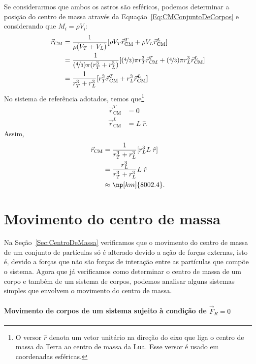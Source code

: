 Se considerarmos que ambos os astros são esféricos, podemos determinar a posição do centro de massa através da Equação~\ref{Eq:CMConjuntoDeCorpos} e considerando que $M_i = \rho V_i$:
 \begin{align}
    \vec{r}_{\rm{CM}} &= \frac{1}{\rho(V_T + V_L)} [\rho V_T \vec{r}_{\text{CM}}^T + \rho V_L \vec{r}_{\text{CM}}^L] \\
    &= \frac{1}{(\nicefrac{4}{3}) \pi(r_T^3 + r_L^3)}[(\nicefrac{4}{3})\pi r_T^3 \vec{r}_{\text{CM}}^T + (\nicefrac{4}{3})\pi r_L^3 \vec{r}_{\text{CM}}^L] \\
    &= \frac{1}{r_T^3 + r_L^3} [r_T^3 \vec{r}_{\text{CM}}^T + r_L^3 \vec{r}_{\text{CM}}^L] 
\end{align}
%
No sistema de referência adotados, temos que\footnote{O versor $\hat{r}$ denota um vetor unitário na direção do eixo que liga o centro de massa da Terra ao centro de massa da Lua. Esse versor é usado em coordenadas esféricas.}
\begin{align}
    \vec{r}_{\text{CM}}^T &= 0 \\
    \vec{r}_{\text{CM}}^L &= L \; \hat{r}.
\end{align}
%
Assim,
 \begin{align}
    \vec{r}_{\rm{CM}} &= \frac{1}{r_T^3 + r_L^3} [r_L^3 L \; \hat{r}] \\
    &=\frac{r_L^3}{r_T^3 + r_L^3} L \; \hat{r} \\
    &\approx \np[km]{8002.4}.
\end{align}

\section{Movimento do centro de massa}

Na Seção~\ref{Sec:CentroDeMassa} verificamos que o movimento do centro de massa de um conjunto de partículas só é alterado devido a ação de forças externas, isto é, devido a forças que não são forças de interação entre as partículas que compõe o sistema. Agora que já verificamos como determinar o centro de massa de um corpo e também de um sistema de corpos, podemos analisar alguns sistemas simples que envolvem o movimento do centro de massa.

\paragraph{Movimento de corpos de um sistema sujeito à condição de $\vec{F}_R = 0$}

